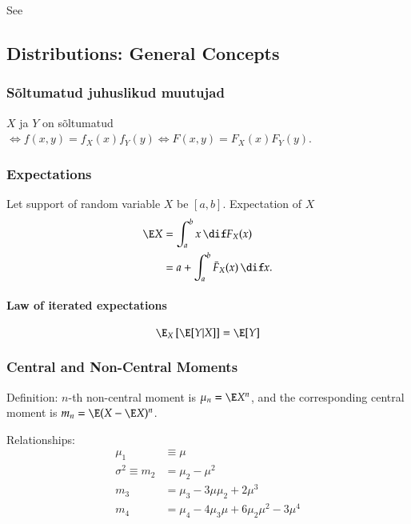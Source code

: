 \documentclass[a4paper]{article}
\numberwithin{equation}{subsection}
\begin{document}
See \citet{newey1991Econometrica}


\subsection{Distributions: General Concepts}



\label{sec:jaotused_mqisted}

\subsubsection{Sõltumatud juhuslikud muutujad}
$X$ ja $Y$ on sõltumatud $\Leftrightarrow f(x,y) = f_X(x) f_Y(y)
\Leftrightarrow F(x,y) = F_X(x) F_Y(y)$.

\subsubsection{Expectations}
Let support of random variable $X$ be $[a, b]$.  Expectation of $X$
\begin{align}
  \E X
  &=
  \int_a^b x \, \dif F_X(x)\\
  &=
  a + \int_a^b \bar F_X(x) \,\dif x.
\end{align}

\paragraph{Law of iterated expectations}
\begin{equation}
  \E_X
  \left[ \E [Y|X] \right]
  =
  \E [Y]
\end{equation}


\subsubsection{Central and Non-Central Moments}

Definition: $n$-th non-central moment is $\mu_{n} = \E X^{n}$, and the
corresponding central moment is $m_{n} = \E ( X - \E X)^{n}$.

Relationships:
\begin{align}
  \mu_{1} &\equiv \mu
  \\
  \sigma^{2} \equiv m_{2} &= \mu_{2} - \mu^{2}
  \\
  m_{3} &= \mu_{3}- 3 \mu \mu_{2} + 2\mu^{3}
  \\
  m_{4} &= \mu_{4} - 4 \mu_{3} \mu + 6 \mu_{2} \mu^{2} -3 \mu^{4}
\end{align}
\end{document}
